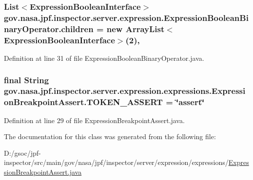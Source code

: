 \subsubsection[{\texorpdfstring{children}{children}}]{\setlength{\rightskip}{0pt plus 5cm}List$<${\bf Expression\+Boolean\+Interface}$>$ gov.\+nasa.\+jpf.\+inspector.\+server.\+expression.\+Expression\+Boolean\+Binary\+Operator.\+children = new Array\+List$<${\bf Expression\+Boolean\+Interface}$>$(2)\hspace{0.3cm}{\ttfamily [protected]}, {\ttfamily [inherited]}}\hypertarget{classgov_1_1nasa_1_1jpf_1_1inspector_1_1server_1_1expression_1_1_expression_boolean_binary_operator_aa51f2a94e4b46898cc588a25f3957f6f}{}\label{classgov_1_1nasa_1_1jpf_1_1inspector_1_1server_1_1expression_1_1_expression_boolean_binary_operator_aa51f2a94e4b46898cc588a25f3957f6f}


Definition at line 31 of file Expression\+Boolean\+Binary\+Operator.\+java.

\subsubsection[{\texorpdfstring{T\+O\+K\+E\+N\+\_\+\+A\+S\+S\+E\+RT}{TOKEN_ASSERT}}]{\setlength{\rightskip}{0pt plus 5cm}final String gov.\+nasa.\+jpf.\+inspector.\+server.\+expression.\+expressions.\+Expression\+Breakpoint\+Assert.\+T\+O\+K\+E\+N\+\_\+\+A\+S\+S\+E\+RT = \char`\"{}assert\char`\"{}\hspace{0.3cm}{\ttfamily [static]}}\hypertarget{classgov_1_1nasa_1_1jpf_1_1inspector_1_1server_1_1expression_1_1expressions_1_1_expression_breakpoint_assert_a39799eee97d0ac5b0f8e8140b5699551}{}\label{classgov_1_1nasa_1_1jpf_1_1inspector_1_1server_1_1expression_1_1expressions_1_1_expression_breakpoint_assert_a39799eee97d0ac5b0f8e8140b5699551}


Definition at line 29 of file Expression\+Breakpoint\+Assert.\+java.



The documentation for this class was generated from the following file\+:\begin{DoxyCompactItemize}
\item 
D\+:/gsoc/jpf-\/inspector/src/main/gov/nasa/jpf/inspector/server/expression/expressions/\hyperlink{_expression_breakpoint_assert_8java}{Expression\+Breakpoint\+Assert.\+java}\end{DoxyCompactItemize}
